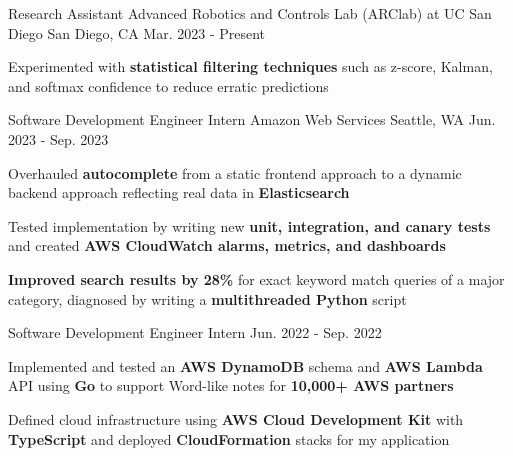 

\begin{cventries}
  \cventry
    {Research Assistant}
    {Advanced Robotics and Controls Lab (ARClab) at UC San Diego}
    {San Diego, CA}
    {Mar. 2023 - Present}
    {
      \begin{cvitems}
        \item {Experimented with \textbf{statistical filtering techniques} such as z-score, Kalman, and softmax confidence to reduce erratic predictions} 
      \end{cvitems}
    }

  \cvtwoentry
    {Software Development Engineer Intern} %
    {Amazon Web Services} %
    {Seattle, WA} %
    {Jun. 2023 - Sep. 2023}
    {
      \begin{cvitems}
        \item {Overhauled \textbf{autocomplete} from a static frontend approach to a dynamic backend approach reflecting real data in \textbf{Elasticsearch}}
        \item {Tested implementation by writing new \textbf{unit, integration, and canary tests} and created \textbf{AWS CloudWatch alarms, metrics, and dashboards}}
        \item {\textbf{Improved search results by 28\%} for exact keyword match queries of a major category, diagnosed by writing a \textbf{multithreaded Python} script}
      \end{cvitems}
    }
    {Software Development Engineer Intern}
    {Jun. 2022 - Sep. 2022} %
    {
      \begin{cvitems} %
        \item {Implemented and tested an \textbf{AWS DynamoDB} schema and \textbf{AWS Lambda} API using \textbf{Go} to support Word-like notes for \textbf{10,000+ AWS partners} }
        \item {Defined cloud infrastructure using \textbf{AWS Cloud Development Kit} with \textbf{TypeScript} and deployed \textbf{CloudFormation} stacks for my application}
      \end{cvitems}
    }


\end{cventries}
